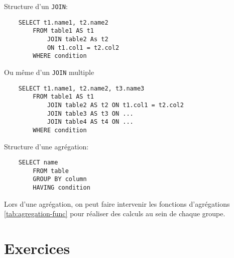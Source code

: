 Structure d'un \texttt{JOIN}:

\begin{verbatim}
    SELECT t1.name1, t2.name2
        FROM table1 AS t1
            JOIN table2 As t2
            ON t1.col1 = t2.col2
        WHERE condition
\end{verbatim}

Ou même d'un \texttt{JOIN} multiple
\begin{verbatim}
    SELECT t1.name1, t2.name2, t3.name3
        FROM table1 AS t1
            JOIN table2 AS t2 ON t1.col1 = t2.col2
            JOIN table3 AS t3 ON ...
            JOIN table4 AS t4 ON ...
        WHERE condition
\end{verbatim}

Structure d'une agrégation:

\begin{verbatim}
    SELECT name
        FROM table
        GROUP BY column
        HAVING condition
\end{verbatim}

Lors d'une agrégation, on peut faire intervenir les fonctions d'agrégations \ref{tab:agregation-func} pour réaliser des calculs au sein de chaque groupe.


\section{Exercices}

